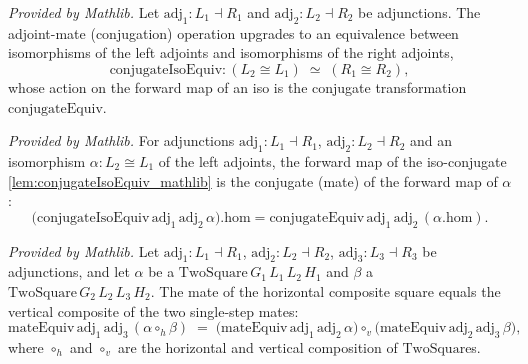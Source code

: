 \begin{lemma}
  \label{lem:conjugateIsoEquiv_mathlib}
  \mathlibok
  \textit{Provided by Mathlib.}
  Let \(\mathrm{adj}_1 : L_1 \dashv R_1\) and \(\mathrm{adj}_2 : L_2 \dashv R_2\) be adjunctions. The
  adjoint-mate (conjugation) operation upgrades to an equivalence between isomorphisms of the left
  adjoints and isomorphisms of the right adjoints,
  \[
    \mathrm{conjugateIsoEquiv} : (L_2 \cong L_1) \;\simeq\; (R_1 \cong R_2),
  \]
  whose action on the forward map of an iso is the conjugate transformation \(\mathrm{conjugateEquiv}\).
\end{lemma}

\begin{lemma}
  \label{lem:conjugateIsoEquiv_apply_hom_mathlib}
  \mathlibok
  \textit{Provided by Mathlib.}
  For adjunctions \(\mathrm{adj}_1 : L_1 \dashv R_1\), \(\mathrm{adj}_2 : L_2 \dashv R_2\) and an
  isomorphism \(\alpha : L_2 \cong L_1\) of the left adjoints, the forward map of the iso-conjugate
  \cref{lem:conjugateIsoEquiv_mathlib} is the conjugate (mate) of the forward map of \(\alpha\):
  \[
    \bigl(\mathrm{conjugateIsoEquiv}\,\mathrm{adj}_1\,\mathrm{adj}_2\,\alpha\bigr).\mathrm{hom}
      = \mathrm{conjugateEquiv}\,\mathrm{adj}_1\,\mathrm{adj}_2\,(\alpha.\mathrm{hom}).
  \]
\end{lemma}

\begin{lemma}
  \label{lem:mateEquiv_vcomp_mathlib}
  \mathlibok
  \textit{Provided by Mathlib.}
  Let \(\mathrm{adj}_1 : L_1 \dashv R_1\), \(\mathrm{adj}_2 : L_2 \dashv R_2\),
  \(\mathrm{adj}_3 : L_3 \dashv R_3\) be adjunctions, and let \(\alpha\) be a
  \(\mathrm{TwoSquare}\,G_1\,L_1\,L_2\,H_1\) and \(\beta\) a
  \(\mathrm{TwoSquare}\,G_2\,L_2\,L_3\,H_2\). The mate of the horizontal composite square
  equals the vertical composite of the two single-step mates:
  \[
    \mathrm{mateEquiv}\,\mathrm{adj}_1\,\mathrm{adj}_3\,(\alpha \mathbin{\circ_h} \beta)
      \;=\;
    \bigl(\mathrm{mateEquiv}\,\mathrm{adj}_1\,\mathrm{adj}_2\,\alpha\bigr)
      \mathbin{\circ_v}
    \bigl(\mathrm{mateEquiv}\,\mathrm{adj}_2\,\mathrm{adj}_3\,\beta\bigr),
  \]
  where \(\mathbin{\circ_h}\) and \(\mathbin{\circ_v}\) are the horizontal and vertical
  composition of \(\mathrm{TwoSquare}\)s.
\end{lemma}

